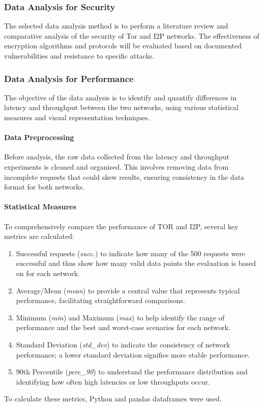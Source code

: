 \documentclass[12pt,conference]{IEEEtran}
\begin{document}
\subsubsection{Data Analysis for Security}
The selected data analysis method is to perform a literature review and comparative analysis of the security of Tor and I2P networks. The effectiveness of encryption algorithms and protocols will be evaluated based on documented vulnerabilities and resistance to specific attacks.
\subsubsection{Data Analysis for Performance}
The objective of the data analysis is to identify and quantify differences in latency and throughput between the two networks, using various statistical measures and visual representation techniques.
\paragraph{Data Preprocessing} Before analysis, the raw data collected from the latency and throughput experiments is cleaned and organised. This involves removing data from incomplete requests that could skew results, ensuring consistency in the data format for both networks.
\paragraph{Statistical Measures}
To comprehensively compare the performance of TOR and I2P, several key metrics are calculated:
\begin{enumerate}
	\item Successful requests (\textit{succ.}) to indicate how many of the 500 requests were successful and thus show how many valid data points the evaluation is based on for each network.
	\item Average/Mean (\textit{mean}) to provide a central value that represents typical performance, facilitating straightforward comparisons.
	\item Minimum (\textit{min}) and Maximum (\textit{max}) to help identify the range of performance and the best and worst-case scenarios for each network.
	\item Standard Deviation (\textit{std\_dev}) to indicate the consistency of network performance; a lower standard deviation signifies more stable performance.
	\item 90th Percentile (\textit{perc\_90}) to understand the performance distribution and identifying how often high latencies or low throughputs occur.
\end{enumerate}
To calculate these metrics, Python and pandas dataframes were used.
\end{document}
